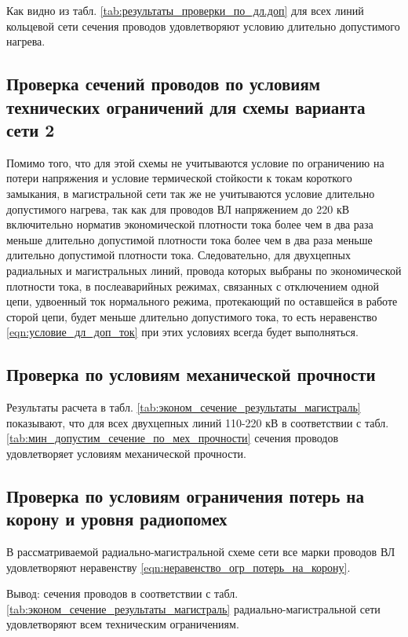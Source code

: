 Как видно из табл. \ref{tab:результаты_проверки_по_дл.доп} для всех линий кольцевой сети сечения проводов удовлетворяют условию длительно допустимого нагрева.

\subsection{Проверка сечений проводов по условиям технических ограничений для схемы варианта сети 2}

Помимо того, что для этой схемы не учитываются условие по ограничению на потери напряжения и условие термической стойкости к токам короткого замыкания, в магистральной сети так же не учитываются условие длительно допустимого нагрева, так как для проводов ВЛ напряжением до 220 кВ включительно норматив экономической плотности тока более чем в два раза меньше длительно допустимой плотности тока более чем в два раза меньше длительно допустимой плотности тока. Следовательно, для двухцепных радиальных и магистральных линий, провода которых выбраны по экономической плотности тока, в послеаварийных режимах, связанных с отключением одной цепи, удвоенный ток нормального режима, протекающий по оставшейся в работе сторой цепи, будет меньше длительно допустимого тока, то есть неравенство \eqref{eqn:условие_дл_доп_ток} при этих условиях всегда будет выполняться.

\subsection*{Проверка по условиям механической прочности}

Результаты расчета в табл. \ref{tab:эконом_сечение_результаты_магистраль} показывают, что для всех двухцепных линий 110-220 кВ в соответствии с табл. \ref{tab:мин_допустим_сечение_по_мех_прочности} сечения проводов удовлетворяет условиям механической прочности.

\subsection*{Проверка по условиям ограничения потерь на корону и уровня радиопомех}

В рассматриваемой радиально-магистральной схеме сети все марки проводов ВЛ удовлетворяют неравенству \eqref{eqn:неравенство_огр_потерь_на_корону}.

Вывод: сечения проводов в соответствии с табл. \ref{tab:эконом_сечение_результаты_магистраль} радиально-магистральной сети удовлетворяют всем техническим ограничениям.



